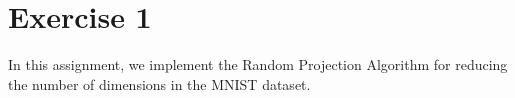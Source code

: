 \section*{Exercise 1}
In this assignment, we implement the Random Projection Algorithm for reducing the number of dimensions in the MNIST dataset. 

